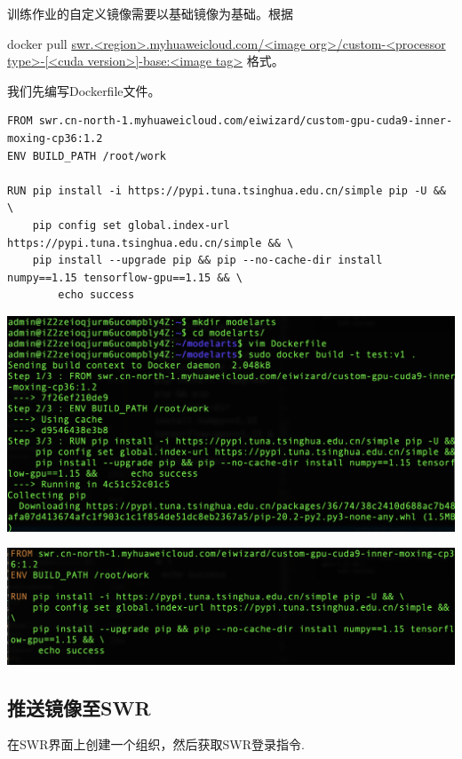 \documentclass[fontset=windows,openany,UTF8]{ctexbook}
\begin{document}
训练作业的自定义镜像需要以基础镜像为基础。根据

docker pull \url{swr.<region>.myhuaweicloud.com/<image org>/custom-<processor type>-[<cuda version>]-base:<image tag>} 格式。

我们先编写Dockerfile文件。

\lstset{language=bash}
\begin{lstlisting}
FROM swr.cn-north-1.myhuaweicloud.com/eiwizard/custom-gpu-cuda9-inner-moxing-cp36:1.2
ENV BUILD_PATH /root/work

RUN pip install -i https://pypi.tuna.tsinghua.edu.cn/simple pip -U && \
    pip config set global.index-url https://pypi.tuna.tsinghua.edu.cn/simple && \
    pip install --upgrade pip && pip --no-cache-dir install numpy==1.15 tensorflow-gpu==1.15 && \
        echo success
\end{lstlisting}

\includegraphics[scale=0.3]{./assets/docker_03.png}  

\includegraphics[scale=0.3]{./assets/docker_04.png}  

\subsection{推送镜像至SWR}

在SWR界面上创建一个组织，然后获取SWR登录指令.
\end{document}
